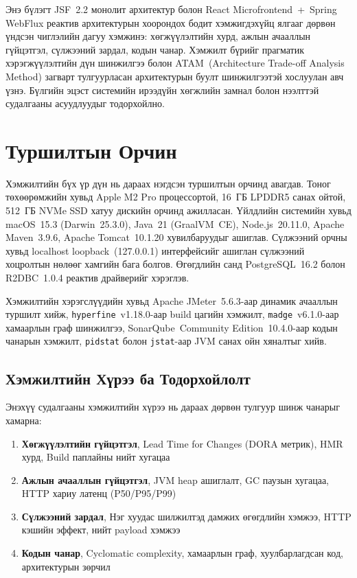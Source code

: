 
Энэ бүлэгт JSF~2.2 монолит архитектур болон React Microfrontend~+~Spring
WebFlux реактив архитектурын хоорондох бодит хэмжигдэхүйц ялгааг дөрвөн
үндсэн чиглэлийн дагуу хэмжинэ: хөгжүүлэлтийн хурд, ажлын ачааллын
гүйцэтгэл, сүлжээний зардал, кодын чанар. Хэмжилт бүрийг прагматик
хэрэгжүүлэлтийн дүн шинжилгээ болон ATAM~(Architecture Trade-off Analysis
Method) загварт тулгуурласан архитектурын буулт шинжилгээтэй хослуулан
авч үзнэ. Бүлгийн эцэст системийн ирээдүйн хөгжлийн замнал болон нээлттэй
судалгааны асуудлуудыг тодорхойлно.

\section{Туршилтын Орчин}


Хэмжилтийн бүх үр дүн нь дараах нэгдсэн туршилтын орчинд авагдав.
Тоног төхөөрөмжийн хувьд Apple M2 Pro процессортой, 16~ГБ LPDDR5 санах
ойтой, 512~ГБ NVMe SSD хатуу дискийн орчинд ажилласан. Үйлдлийн системийн
хувьд macOS~15.3 (Darwin~25.3.0), Java~21 (GraalVM~CE), Node.js~20.11.0,
Apache Maven~3.9.6, Apache Tomcat~10.1.20 хувилбаруудыг ашиглав. Сүлжээний
орчны хувьд localhost loopback~(127.0.0.1) интерфейсийг ашиглан сүлжээний
хоцролтын нөлөөг хамгийн бага болгов. Өгөгдлийн санд PostgreSQL~16.2
болон R2DBC~1.0.4 реактив драйверийг хэрэглэв.

Хэмжилтийн хэрэгслүүдийн хувьд Apache JMeter~5.6.3-аар динамик ачааллын
туршилт хийж, \texttt{hyperfine}~v1.18.0-аар build цагийн хэмжилт,
\texttt{madge}~v6.1.0-аар хамаарлын граф шинжилгээ, SonarQube~Community
Edition~10.4.0-аар кодын чанарын хэмжилт, \texttt{pidstat} болон
\texttt{jstat}-аар JVM санах ойн хяналтыг хийв.

\subsection{Хэмжилтийн Хүрээ ба Тодорхойлолт}

Энэхүү судалгааны хэмжилтийн хүрээ нь дараах дөрвөн тулгуур шинж
чанарыг хамарна:

\begin{enumerate}
  \item \textbf{Хөгжүүлэлтийн гүйцэтгэл}, Lead Time for Changes
    (DORA метрик), HMR хурд, Build паплайны нийт хугацаа
  \item \textbf{Ажлын ачааллын гүйцэтгэл}, JVM heap ашиглалт,
    GC паузын хугацаа, HTTP хариу латенц (P50/P95/P99)
  \item \textbf{Сүлжээний зардал}, Нэг хуудас шилжилтэд дамжих
    өгөгдлийн хэмжээ, HTTP кэшийн эффект, нийт payload хэмжээ
  \item \textbf{Кодын чанар}, Cyclomatic complexity, хамаарлын
    граф, хуулбарлагдсан код, архитектурын зөрчил
\end{enumerate}

